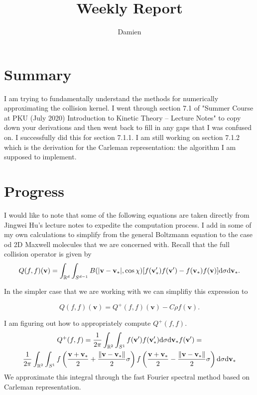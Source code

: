 \documentclass{article}
\title{Weekly Report}
\author{Damien}
\def\t{\text}
\def\b{\mathbf}
\begin{document}
\maketitle
\section{Summary}

I am trying to fundamentally understand the methods for numerically approximating the collision kernel. I went through section 7.1 of "Summer Course at PKU (July 2020) Introduction to Kinetic Theory – Lecture Notes" to copy down your derivations and then went back to fill in any gaps that I was confused on. I successfully did this for section 7.1.1. I am still working on section 7.1.2 which is the derivation for the Carleman representation: the algorithm I am supposed to implement. 

\section{Progress}
I would like to note that some of the following equations are taken directly from Jingwei Hu's lecture notes to expedite the computation process. I add in some of my own calculations to simplify from the general Boltzmann equation to the case od 2D Maxwell molecules that we are concerned with. Recall that the full collision operator is given by
\begin{equation} \label{eq:collision}
    Q(f,f)(\b v) = \int_{\mathbb{R}^d} \int_{S^{d-1}} B(|\b v - \b v_*|,\cos \chi)[f(\b v_*') f(\b v') - f(\b v_*) f(\b v)] \t d \sigma \t d \b v_*.
\end{equation}

In the simpler case that we are working with we can simplifiy this expression to

\[
    Q(f,f)(\b v) = Q^+(f,f)(\b v) - C \rho f(\b v).
\]

I am figuring out how to appropriately compute $Q^+(f,f)$.
\begin{gather*}
    Q^+(f,f) = \frac{1}{2 \pi} \int_{\mathbb{R}^2} \int_{S^1} f(\b v') f(\b v'_*) \t d \sigma \t d \b v_*f(\b v') = \\
    \frac{1}{2 \pi} \int_{\mathbb{R}^2} \int_{S^1} f \left(\frac{\b v + \b v_*}{2} + \frac{\|\b v - \b v_*\| }{2} \sigma \right) f \left(\frac{\b v + \b v_*}{2} - \frac{\|\b v - \b v_*\| }{2} \sigma \right)\t d \sigma \t d \b v_*
\end{gather*}
We approximate this integral through the fast Fourier spectral method based on Carleman representation.
\end{document}
